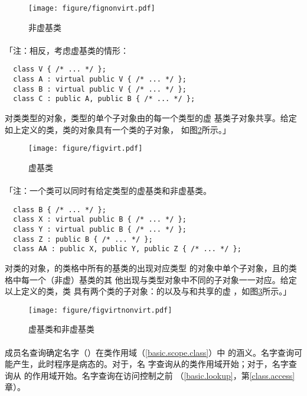 \begin{figure}[htpb]
  \centering
  \texttt{[image: figure/fignonvirt.pdf]}
  \caption{非虚基类}
  \label{fig:nonvirt}
\end{figure}

\paragraph{}
「注：相反，考虑虚基类的情形：
\begin{lstlisting}
  class V { /* ... */ };
  class A : virtual public V { /* ... */ };
  class B : virtual public V { /* ... */ };
  class C : public A, public B { /* ... */ };
\end{lstlisting}
对类类型的对象，类型的单个子对象由的每一个类型的虚
基类子对象共享。给定如上定义的类，类的对象具有一个类的子对象，
如图\ref{fig:virt}所示。」

\begin{figure}[htpb]
  \centering
  \texttt{[image: figure/figvirt.pdf]}
  \caption{虚基类}
  \label{fig:virt}
\end{figure}

\paragraph{}
「注：一个类可以同时有给定类型的虚基类和非虚基类。
\begin{lstlisting}
  class B { /* ... */ };
  class X : virtual public B { /* ... */ };
  class Y : virtual public B { /* ... */ };
  class Z : public B { /* ... */ };
  class AA : public X, public Y, public Z { /* ... */ };
\end{lstlisting}
对类的对象，的类格中所有的基类的出现对应类型
的对象中单个子对象，且的类格中每一个（非虚）基类的其
他出现与类型对象中不同的子对象一一对应。给定以上定义的类，类
具有两个类的子对象：的以及与和共享的虚
，如图\ref{fig:virtnonvirt}所示。」

\begin{figure}[htpb]
  \centering
  \texttt{[image: figure/figvirtnonvirt.pdf]}
  \caption{虚基类和非虚基类}
  \label{fig:virtnonvirt}
\end{figure}

\paragraph{}
成员名查询确定名字（）在类作用域（\ref{basic.scope.class}）中
的涵义。名字查询可能产生，此时程序是病态的。对于，名
字查询从的类作用域开始；对于，名字查询从
的作用域开始。名字查询在访问控制之前
（\ref{basic.lookup}，第\ref{class.access}章）。


